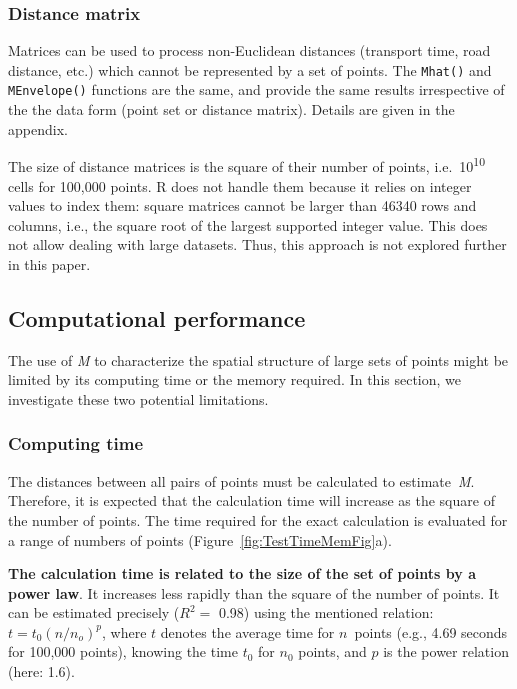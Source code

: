 \documentclass[fleqn,10pt]{latex/stylish_article} %
\begin{document}
\normalsize

\subsubsection{Distance matrix}\label{distance-matrix}

Matrices can be used to process non-Euclidean distances (transport time, road distance, etc.) which cannot be represented by a set of points.
The \texttt{Mhat()} and \texttt{MEnvelope()} functions are the same, and provide the same results irrespective of the the data form (point set or distance matrix).
Details are given in the appendix.

The size of distance matrices is the square of their number of points, i.e.~10\textsuperscript{10} cells for 100,000 points.
R does not handle them because it relies on integer values to index them: square matrices cannot be larger than 46340 rows and columns, i.e., the square root of the largest supported integer value.
This does not allow dealing with large datasets.
Thus, this approach is not explored further in this paper.

\subsection{Computational performance}\label{computational-performance}

The use of \emph{M} to characterize the spatial structure of large sets of points might be limited by its computing time or the memory required.
In this section, we investigate these two potential limitations.

\subsubsection{Computing time}\label{computing-time}

The distances between all pairs of points must be calculated to estimate~\emph{M}.
Therefore, it is expected that the calculation time will increase as the square of the number of points.
The time required for the exact calculation is evaluated for a range of numbers of points (Figure~\ref{fig:TestTimeMemFig}a).

\textbf{The calculation time is related to the size of the set of points by a power law}.
It increases less rapidly than the square of the number of points.
It can be estimated precisely (\(R^2=\) 0.98) using the mentioned relation: \(t=t_0 (n/n_o)^p\), where \(t\) denotes the average time for \(n\)~points (e.g., 4.69 seconds for 100,000 points), knowing the time \(t_0\) for \(n_0\) points, and \(p\) is the power relation (here: 1.6).
\end{document}
